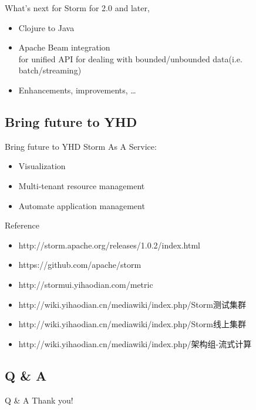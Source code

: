\documentclass{beamer}
\begin{document}
\begin{frame}{What's next for Storm}
  for 2.0 and later,
  \begin{itemize}
    \item Clojure to Java
    \item Apache Beam integration\\
      for unified API for dealing with bounded/unbounded data(i.e. batch/streaming)
    \item Enhancements, improvements, \ldots
  \end{itemize}
\end{frame}

\subsection{Bring future to YHD}

\begin{frame}{Bring future to YHD}
  Storm As A Service:
  \begin{itemize}
    \item Visualization
    \item Multi-tenant resource management
    \item Automate application management
  \end{itemize}
\end{frame}

\begin{frame}{Reference}
  \begin{itemize}
    \item http://storm.apache.org/releases/1.0.2/index.html
    \item https://github.com/apache/storm
    \item http://stormui.yihaodian.com/metric
    \item http://wiki.yihaodian.cn/mediawiki/index.php/Storm测试集群
    \item http://wiki.yihaodian.cn/mediawiki/index.php/Storm线上集群
    \item http://wiki.yihaodian.cn/mediawiki/index.php/架构组-流式计算
  \end{itemize}
\end{frame}

\subsection{Q \& A}
\begin{frame}{Q \& A}
  Thank you!
\end{frame}
\end{document}
